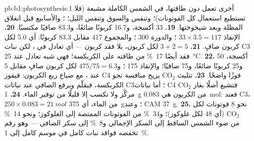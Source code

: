 \begin{solution}{pb:b1:photosynthesis:1}
 أخرى تعمل دون طاقتها،  في الشمس الكاملة مشبعة (فلا
تستطيع  استعمال كل الفوتونات)؛ وتنفس  والسوق وتنفس
الليل؛ ؛ والأسابيع قبل انغلاق المظلة وبعد شيخوختها.
\textbf{19.} 33 أكسجة، و16.7 كربونًا ضائعًا، و83.3 صافيًا مكتسبًا.
\textbf{20.} الإنقاذ $33\times 3.5 = 117$ ؛ والدورة 300 ؛
والمجموع 417  مقابل 83.3 كربونًا: أي 5.0  لكل كربون صافٍ.
\textbf{21.} $3 + 2 = 5$  لكل كربون، بلا فقد كربون --- أي تعادل في
، لكن نبات C3 فقد أيضًا \qty{17}{\%} من طاقته على الكربكسة؛ فهي
شبه تعادل عند \qty{25}{\celsius}.
\textbf{22.} 50 أكسجة، و25 كربونًا ضائعًا، و75 صافيًا؛ والإنقاذ 175
؛ و$475/75 = 6.3$  لكل كربون صافٍ مقابل 5 عند ، مع ضياع
ربع الكربون: فيفوز C4 فوزًا واضحًا.
\textbf{23.} تثليث $\mathrm{CO_2}$ يزيح منافسة  نحو الكربكسة،
فيقلّم  ويرفع  الصافي عند نباتات C3؛ أما نباتات
C4 فتشبع  أصلًا بغاز $\mathrm{CO_2}$ مركَّز ولا تكسب إلا قليلًا
من توفير الماء.
\textbf{24.} \qty{1}{g} من الكربون هي \qty{0.083}{mol}: فعند C3، $250\times 0.083 = \qty{21}{mol}$ من الماء، أي \qty{375}{g}؛ وعند CAM \qty{37}{g}.
\textbf{25.} نحو 8 فوتونات لكل $\mathrm{CO_2}$ (أي 48 لكل غلوكوز)؛
و\qty{34}{\%} من الفوتونات الممتصة إلى الغلوكوز؛ ونحو \qty{14}{\%} من
ضوء الشمس الساقط إلى السكر الإجمالي و\qty{8}{\%} إلى سكر 
الصافي --- وهو رقم تخفضه فواقد نبات كامل في موسم كامل إلى
\qty{1}{\%}.
\end{solution}

